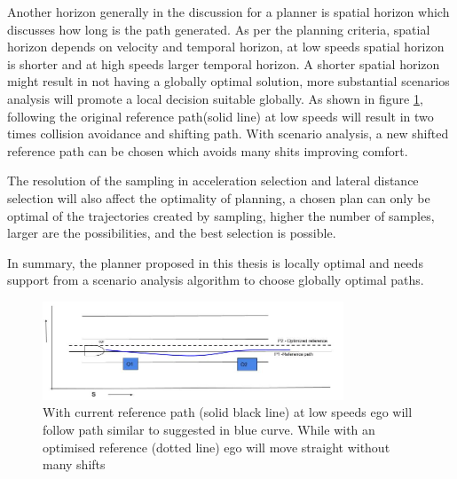 Another horizon generally in the discussion for a planner is spatial horizon which discusses how long is the path generated. As per the planning criteria, spatial horizon depends on velocity and temporal horizon, at low speeds spatial horizon is shorter and at high speeds larger temporal horizon. A shorter spatial horizon might result in not having a globally optimal solution, more substantial scenarios analysis will promote a local decision suitable globally. As shown in figure \ref{optimized_reference}, following the original reference path(solid line) at low speeds will result in two times collision avoidance and shifting path. With scenario analysis, a new shifted reference path can be chosen which avoids many shits improving comfort.

The resolution of the sampling in acceleration selection and lateral distance selection will also affect the optimality of planning, a chosen plan can only be optimal of the trajectories created by sampling, higher the number of samples, larger are the possibilities, and the best selection is possible. 

In summary, the planner proposed in this thesis is locally optimal and needs support from a scenario analysis algorithm to choose globally optimal paths. 
 
 \begin{figure}[h]
    \centering
    \includegraphics[width=0.8\textwidth]{Images/evaluation/optimized_reference.jpg}
    \caption{With current reference path (solid black line) at low speeds ego will follow path similar to suggested in blue curve. While with an optimised reference (dotted line) ego will move straight without many shifts}
    \label{optimized_reference}
\end{figure}

